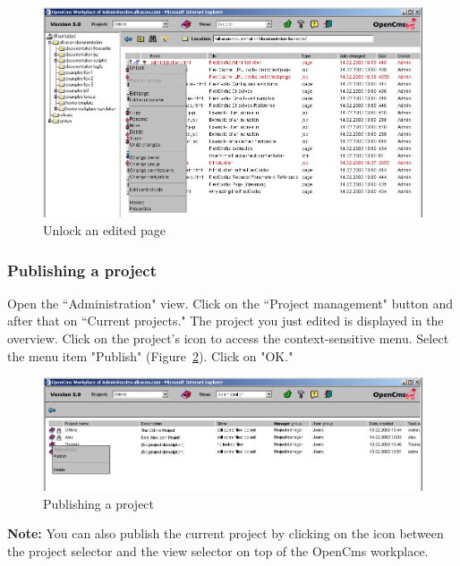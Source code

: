 \begin{figure}[!hbt]
\begin{center}
\includegraphics[width=\sgw]
                   {pics/usermanual/unlockPage}
\caption[Unlock an edited page]
           {Unlock an edited page}
\label{unlockpage}
\end{center}
\end{figure}

\subsubsection{Publishing a project}

Open the ``Administration" view. Click on the ``Project management"
button and after that on ``Current projects." The project you just edited
is displayed in the overview. Click on the project's icon to
access the context-sensitive menu. Select the menu item "Publish"
(Figure~\ref{publishproject}). Click on "OK."

\begin{figure}[!hbt]
\begin{center}
\includegraphics[width=\sgw]
                   {pics/usermanual/publishProject01}
\caption[Publishing a project]
           {Publishing a project}
\label{publishproject}
\end{center}
\end{figure}

\textbf{Note:} You can also publish the current project by clicking on the
icon between the project selector and the view selector on top of the OpenCms workplace.


